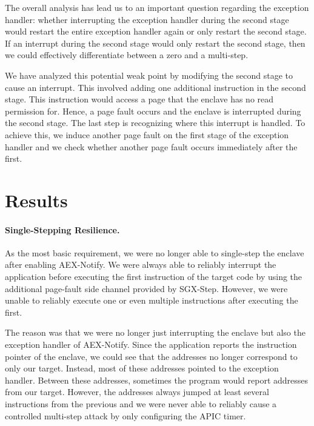 \documentclass{llncs}
\begin{document}

The overall analysis has lead us to an important question regarding the exception handler:
whether interrupting the exception handler during the second stage would
restart the entire exception handler again or only restart the second stage.
If an interrupt during the second stage would only restart the second stage,
then we could effectively differentiate between a zero and a multi-step.

We have analyzed this potential weak point by modifying the second stage to cause an interrupt.
This involved adding one additional instruction in the second stage.
This instruction would access a page that the enclave has no read permission for.
Hence, a page fault occurs and the enclave is interrupted during the second stage.
The last step is recognizing where this interrupt is handled.
To achieve this, we induce another page fault on the first stage of the exception handler
and we check whether another page fault occurs immediately after the first.

\section{Results}

\paragraph{Single-Stepping Resilience.}
As the most basic requirement,
we were no longer able to single-step the enclave after enabling AEX-Notify.
We were always able to reliably interrupt the application
before executing the first instruction of the target code
by using the additional page-fault side channel provided by SGX-Step.
However, we were unable to reliably execute one or
even multiple instructions after executing the first.

The reason was that we were no longer just interrupting the enclave but also the exception handler of AEX-Notify.
Since the application reports the instruction pointer of the enclave,
we could see that the addresses no longer correspond to only our target.
Instead, most of these addresses pointed to the exception handler.
Between these addresses, sometimes the program would report addresses from our target.
However, the addresses always jumped at least several instructions from the previous
and we were never able to reliably cause a controlled multi-step attack
by only configuring the APIC timer.
\end{document}
